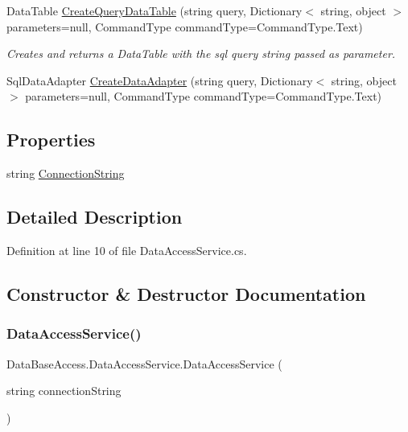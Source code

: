 \begin{DoxyCompactItemize}
Data\+Table \mbox{\hyperlink{classDataBaseAccess_1_1DataAccessService_a587d762011b75b6b184ba56007fd9495}{Create\+Query\+Data\+Table}} (string query, Dictionary$<$ string, object $>$ parameters=null, Command\+Type command\+Type=Command\+Type.\+Text)
\begin{DoxyCompactList}\small\item\em Creates and returns a Data\+Table with the sql query string passed as parameter. \end{DoxyCompactList}\item 
Sql\+Data\+Adapter \mbox{\hyperlink{classDataBaseAccess_1_1DataAccessService_ae6a0580081ad0f43553d20a4a9b8507f}{Create\+Data\+Adapter}} (string query, Dictionary$<$ string, object $>$ parameters=null, Command\+Type command\+Type=Command\+Type.\+Text)
\end{DoxyCompactItemize}
\subsection*{Properties}
\begin{DoxyCompactItemize}
\item 
string \mbox{\hyperlink{classDataBaseAccess_1_1DataAccessService_a68fdde0329f29760ea79961cb70da656}{Connection\+String}}
\end{DoxyCompactItemize}


\subsection{Detailed Description}


Definition at line 10 of file Data\+Access\+Service.\+cs.



\subsection{Constructor \& Destructor Documentation}
\mbox{\label{classDataBaseAccess_1_1DataAccessService_a1a8ce18984787ddbb8ecf1aa0a71b003}} 
\subsubsection{\texorpdfstring{DataAccessService()}{DataAccessService()}}
{\footnotesize\ttfamily Data\+Base\+Access.\+Data\+Access\+Service.\+Data\+Access\+Service (\begin{DoxyParamCaption}\item[{string}]{connection\+String }\end{DoxyParamCaption})}




